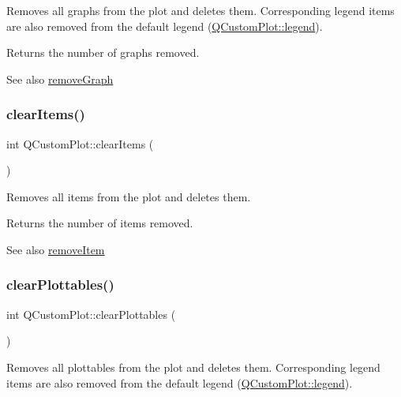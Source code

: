 Removes all graphs from the plot and deletes them. Corresponding legend items are also removed from the default legend (\hyperlink{class_q_custom_plot_a4eadcd237dc6a09938b68b16877fa6af}{Q\+Custom\+Plot\+::legend}).

Returns the number of graphs removed.

\begin{DoxySeeAlso}{See also}
\hyperlink{class_q_custom_plot_a903561be895fb6528a770d66ac5e6713}{remove\+Graph} 
\end{DoxySeeAlso}
\mbox{\label{class_q_custom_plot_abdfd07d4f0591d0cf967f85013fd3645}} 
\subsubsection{\texorpdfstring{clear\+Items()}{clearItems()}}
{\footnotesize\ttfamily int Q\+Custom\+Plot\+::clear\+Items (\begin{DoxyParamCaption}{ }\end{DoxyParamCaption})}

Removes all items from the plot and deletes them.

Returns the number of items removed.

\begin{DoxySeeAlso}{See also}
\hyperlink{class_q_custom_plot_ae04446557292551e8fb6e2c106e1848d}{remove\+Item} 
\end{DoxySeeAlso}
\mbox{\label{class_q_custom_plot_a9a409bb3201878adb7ffba1c89c4e004}} 
\subsubsection{\texorpdfstring{clear\+Plottables()}{clearPlottables()}}
{\footnotesize\ttfamily int Q\+Custom\+Plot\+::clear\+Plottables (\begin{DoxyParamCaption}{ }\end{DoxyParamCaption})}

Removes all plottables from the plot and deletes them. Corresponding legend items are also removed from the default legend (\hyperlink{class_q_custom_plot_a4eadcd237dc6a09938b68b16877fa6af}{Q\+Custom\+Plot\+::legend}).

